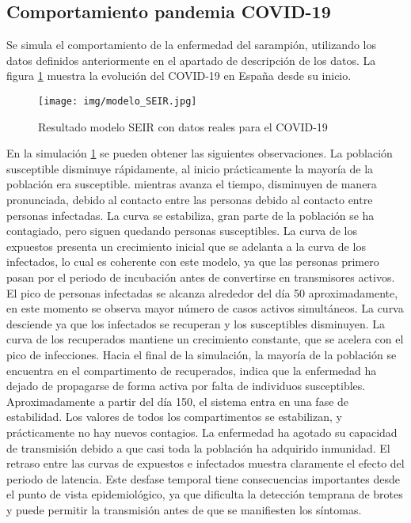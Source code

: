 \subsection{Comportamiento pandemia COVID-19}
Se simula el comportamiento de la enfermedad del sarampión, utilizando los datos definidos anteriormente en el apartado de descripción de los datos. La figura \ref{fig:Simucov} muestra la evolución del COVID-19 en España desde su inicio.

\begin{figure}[H]
    \centering
    \texttt{[image: img/modelo\_SEIR.jpg]}
    \caption{Resultado modelo SEIR con datos reales para el COVID-19}
    \label{fig:Simucov}
    \vspace{0.5cm} %
\end{figure}

En la simulación \ref{fig:Simucov} se pueden obtener las siguientes observaciones. La población susceptible disminuye rápidamente, al inicio prácticamente la mayoría de la población era susceptible. mientras avanza el tiempo, disminuyen de manera pronunciada, debido al contacto entre las personas debido al contacto entre personas infectadas. La curva se estabiliza, gran parte de la población se ha contagiado, pero siguen quedando personas susceptibles.
La curva de los expuestos presenta un crecimiento inicial que se adelanta a la curva de los infectados, lo cual es coherente con este modelo, ya que las personas primero pasan por el periodo de incubación antes de convertirse en transmisores activos. El pico de personas infectadas se alcanza alrededor del día 50 aproximadamente, en este momento se observa mayor número de casos activos simultáneos. La curva desciende ya que los infectados se recuperan y los susceptibles disminuyen.
La curva de los recuperados mantiene un crecimiento constante, que se acelera con el pico de infecciones. Hacia el final de la simulación, la mayoría de la población se encuentra en el compartimento de recuperados, indica que la enfermedad ha dejado de propagarse de forma activa por falta de individuos susceptibles.
Aproximadamente a partir del día 150, el sistema entra en una fase de estabilidad. Los valores de todos los compartimentos se estabilizan, y prácticamente no hay nuevos contagios.  La enfermedad ha agotado su capacidad de transmisión debido a que casi toda la población ha adquirido inmunidad.
El retraso entre las curvas de expuestos e infectados muestra claramente el efecto del periodo de latencia. Este desfase temporal tiene consecuencias importantes desde el punto de vista epidemiológico, ya que dificulta la detección temprana de brotes y puede permitir la transmisión antes de que se manifiesten los síntomas.

